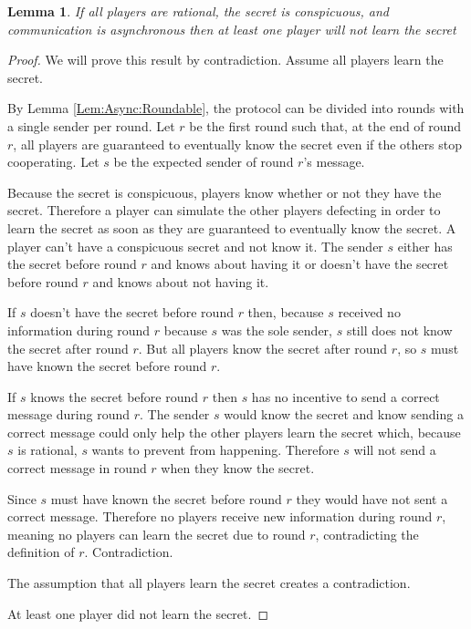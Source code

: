 \documentclass{dalcsthesis}
\newtheorem{lemma}{Lemma}
\begin{document}
\begin{lemma} If all players are rational, the secret is conspicuous, and communication is asynchronous then at least one player will not learn the secret \label{Lem:Async:ConspicuousMustSacrifice} \end{lemma}
\begin{proof}
We will prove this result by contradiction. Assume all players learn the secret.

By Lemma \ref{Lem:Async:Roundable}, the protocol can be divided into rounds with a single sender per round. Let $r$ be the first round such that, at the end of round $r$, all players are guaranteed to eventually know the secret even if the others stop cooperating. Let $s$ be the expected sender of round $r$'s message.

Because the secret is conspicuous, players know whether or not they have the secret. Therefore a player can simulate the other players defecting in order to learn the secret as soon as they are  guaranteed to eventually know the secret. A player can't have a conspicuous secret and not know it. The sender $s$ either has the secret before round $r$ and knows about having it or doesn't have the secret before round $r$ and knows about not having it.

If $s$ doesn't have the secret before round $r$ then, because $s$ received no information during round $r$ because $s$ was the sole sender, $s$ still does not know the secret after round $r$. But all players know the secret after round $r$, so $s$ must have known the secret before round $r$.

If $s$ knows the secret before round $r$ then $s$ has no incentive to send a correct message during round $r$. The sender $s$ would know the secret and know sending a correct message could only help the other players learn the secret which, because $s$ is rational, $s$ wants to prevent from happening. Therefore $s$ will not send a correct message in round $r$ when they know the secret.

Since $s$ must have known the secret before round $r$ they would have not sent a correct message. Therefore no players receive new information during round $r$, meaning no players can learn the secret due to round $r$, contradicting the definition of $r$. Contradiction.

The assumption that all players learn the secret creates a contradiction.

At least one player did not learn the secret.
\end{proof}
\end{document}

